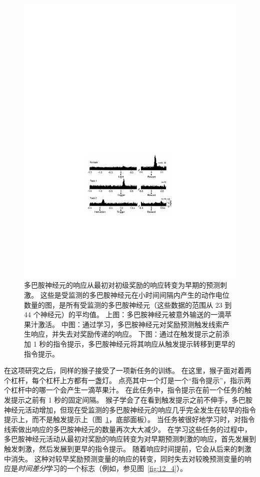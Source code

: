 \begin{figure}[!htb]
	\centering
	\includegraphics[width=0.55\linewidth]{chap12/fig_12_3}
	\caption{多巴胺神经元的响应从最初对初级奖励的响应转变为早期的预测刺激。
		这些是受监测的多巴胺神经元在小时间间隔内产生的动作电位数量的图，是所有受监测的多巴胺神经元（这些数据的范围从 23 到 44 个神经元）的平均值。
		上图：多巴胺神经元被意外输送的一滴苹果汁激活。
		中图：通过学习，多巴胺神经元对奖励预测触发线索产生响应，并失去对奖励传递的响应。
		下图：通过在触发提示之前添加 1 秒的指令提示，多巴胺神经元将其响应从触发提示转移到更早的指令提示\cite{schultz1994reward}。
		\label{fig:12_3}}
\end{figure}



在这项研究之后，同样的猴子接受了一项新任务的训练\cite{schultz1993responses}。
在这里，猴子面对着两个杠杆，每个杠杆上方都有一盏灯。
点亮其中一个灯是一个“指令提示”，指示两个杠杆中的哪一个会产生一滴苹果汁。
在此任务中，指令提示在前一个任务的触发提示之前有 1 秒的固定间隔。
猴子学会了在看到触发提示之前不伸手，多巴胺神经元活动增加，但现在受监测的多巴胺神经元的响应几乎完全发生在较早的指令提示上，而不是触发提示上（图~\ref{fig:12_3}，底部面板）。
当任务被很好地学习时，对指令线索做出响应的多巴胺神经元的数量再次大大减少。
在学习这些任务的过程中，多巴胺神经元活动从最初对奖励的响应转变为对早期预测刺激的响应，首先发展到触发刺激，然后发展到更早的指令提示。
随着响应时间提前，它会从后来的刺激中消失。
这种对较早奖励预测变量的响应的转变，同时失去对较晚预测变量的响应是\textit{时间差分}学习的一个标志（例如，参见图~\ref{fig:12_4}）。



